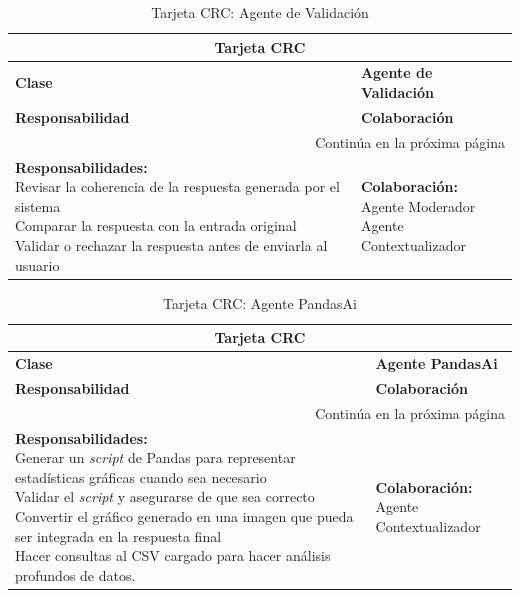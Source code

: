 \begin{longtable}{|l|l|}
	\caption{Tarjeta CRC: Agente de Validación} \label{tablacrc4} \\
	
	\hline
	\multicolumn{2}{|c|}{\textbf{Tarjeta CRC}} \\
	\hline
	\textbf{Clase} & \textbf{Agente de Validación} \\
	\hline
	\endfirsthead
	
	\hline
	\textbf{Responsabilidad} & \textbf{Colaboración} \\
	\hline
	\endhead
	
	\hline
	\multicolumn{2}{|r|}{Continúa en la próxima página} \\
	\hline
	\endfoot
	
	\hline
	\endlastfoot
	
	\parbox[t]{0.45\linewidth}{\textbf{Responsabilidades:} \\ 
		Revisar la coherencia de la respuesta generada por el sistema \\ 
		Comparar la respuesta con la entrada original \\ 
		Validar o rechazar la respuesta antes de enviarla al usuario} 
	& 
	\parbox[t]{0.45\linewidth}{\textbf{Colaboración:} \\
		Agente Moderador \\ 
		Agente Contextualizador}
\end{longtable}

\begin{longtable}{|l|l|}
	\caption{Tarjeta CRC: Agente PandasAi} \label{tablacrc5} \\
	
	\hline
	\multicolumn{2}{|c|}{\textbf{Tarjeta CRC}} \\
	\hline
	\textbf{Clase} & \textbf{Agente PandasAi} \\
	\hline
	\endfirsthead
	
	\hline
	\textbf{Responsabilidad} & \textbf{Colaboración} \\
	\hline
	\endhead
	
	\hline
	\multicolumn{2}{|r|}{Continúa en la próxima página} \\
	\hline
	\endfoot
	
	\hline
	\endlastfoot
	
	\parbox[t]{0.45\linewidth}{\textbf{Responsabilidades:} \\ 
		Generar un \textit{script} de Pandas para representar estadísticas gráficas cuando sea necesario \\ 
		Validar el \textit{script} y asegurarse de que sea correcto \\ 
		Convertir el gráfico generado en una imagen que pueda ser integrada en la respuesta final\\
		Hacer consultas al CSV cargado para hacer análisis profundos de datos.} 
	& 
	\parbox[t]{0.45\linewidth}{\textbf{Colaboración:} \\
		Agente Contextualizador \\ 
		}
\end{longtable}

